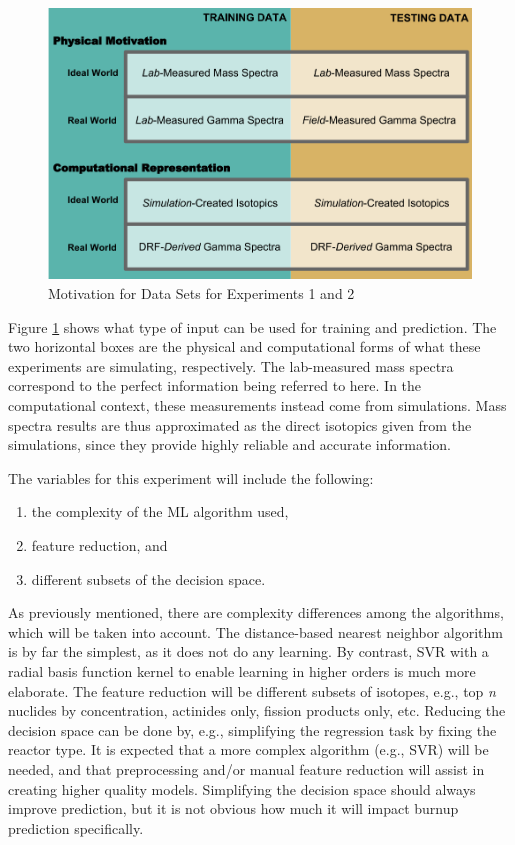 \begin{figure}[!htb]
    \centering
    \includegraphics[width=\linewidth]{./chapters/proposal/proposal.png}
    \caption{Motivation for Data Sets for Experiments 1 and 2}
    \label{fig:proposal}
\end{figure}

Figure \ref{fig:proposal} shows what type of input can be used for training and
prediction.  The two horizontal boxes are the physical and computational forms
of what these experiments are simulating, respectively. The lab-measured mass
spectra correspond to the perfect information being referred to here. In the
computational context, these measurements instead come from simulations. Mass
spectra results are thus approximated as the direct isotopics given from the
simulations, since they provide highly reliable and accurate information.

The variables for this experiment will include the following:
\begin{enumerate}
  \itemsep-0.75em
  \item the complexity of the \gls{ML} algorithm used, 
  \item feature reduction, and 
  \item different subsets of the decision space.
\end{enumerate}

As previously mentioned, there are complexity differences among the algorithms,
which will be taken into account.  The distance-based nearest neighbor
algorithm is by far the simplest, as it does not do any learning. By contrast,
\gls{SVR} with a radial basis function kernel to enable learning in higher
orders is much more elaborate.  The feature reduction will be different subsets
of isotopes, e.g., top \textit{n} nuclides by concentration, actinides only,
fission products only, etc.  Reducing the decision space can be done by, e.g.,
simplifying the regression task by fixing the reactor type. It is expected that
a more complex algorithm (e.g., \gls{SVR}) will be needed, and that
preprocessing and/or manual feature reduction will assist in creating higher
quality models.  Simplifying the decision space should always improve
prediction, but it is not obvious how much it will impact burnup prediction
specifically.

